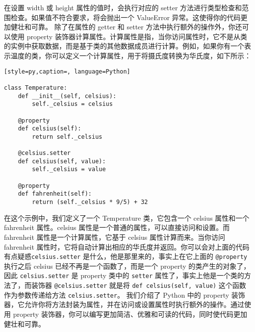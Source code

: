 在设置 width 或 height 属性的值时，会执行对应的 setter 方法进行类型检查和范围检查。如果值不符合要求，将会抛出一个 ValueError 异常。这使得你的代码更加健壮和可靠。
除了在属性的 getter 和 setter 方法中执行额外的操作外，你还可以使用 property 装饰器计算属性。计算属性是指，当你访问属性时，它不是从类的实例中获取数据，而是基于类的其他数据成员进行计算。例如，如果你有一个表示温度的类，你可以定义一个计算属性，用于将摄氏度转换为华氏度，如下所示：
\begin{lstlisting}[style=py,caption=, language=Python]

class Temperature:
    def __init__(self, celsius):
        self._celsius = celsius
    
    @property
    def celsius(self):
        return self._celsius
    
    @celsius.setter
    def celsius(self, value):
        self._celsius = value
    
    @property
    def fahrenheit(self):
        return (self._celsius * 9/5) + 32
\end{lstlisting}
在这个示例中，我们定义了一个 Temperature 类，它包含一个 celsius 属性和一个 fahrenheit 属性。celsius 属性是一个普通的属性，可以直接访问和设置。而 fahrenheit 属性是一个计算属性，它基于 celsius 属性计算而来。当你访问 fahrenheit 属性时，它将自动计算出相应的华氏度并返回。你可以会对上面的代码有点疑惑\verb|celsius.setter| 是什么，他是那里来的，事实上在它上面的 \verb|@property| 执行之后 celsius 已经不再是一个函数了，而是一个 property 的类产生的对象了，因此 \verb|celsius.setter| 是 property 类中的 \verb|setter| 属性了，事实上他是一个类的方法了，而装饰器 \verb|@celsius.setter| 就是将 \verb|def celsius(self, value)| 这个函数作为参数传递给方法 \verb|celsius.setter|。
我们介绍了 Python 中的 property 装饰器，它允许你将方法封装为属性，并在访问或设置属性时执行额外的操作。通过使用 property 装饰器，你可以编写更加简洁、优雅和可读的代码，同时使代码更加健壮和可靠。
